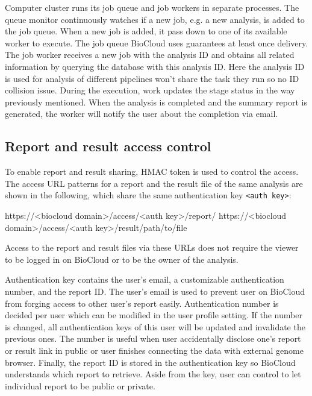 Computer cluster runs its job queue and job workers in separate processes. The
queue monitor continuously watches if a new job, e.g. a new analysis, is added
to the job queue. When a new job is added, it pass down to one of its available
worker to execute. The job queue BioCloud uses guarantees at least once
delivery. The job worker receives a new job with the analysis ID and obtains
all related information by querying the database with this analysis ID. Here
the analysis ID is used for analysis of different pipelines won't share the
task they run so no ID collision issue. During the execution, work updates the
stage status in the way previously mentioned. When the analysis is completed
and the summary report is generated, the worker will notify the user about the
completion via email.


\subsection{Report and result access control}

To enable report and result sharing, HMAC token is used to control the access.
The access URL patterns for a report and the result file of the same analysis
are shown in the following, which share the same authentication key
\texttt{<auth key>}:

\begin{CVerbatim}[fontsize=\small]
https://<biocloud domain>/access/<auth key>/report/
https://<biocloud domain>/access/<auth key>/result/path/to/file
\end{CVerbatim}

\vspace{-1em}\noindent
Access to the report and result files via these URLs does not require the
viewer to be logged in on BioCloud or to be the owner of the analysis.

Authentication key contains the user's email, a customizable authentication
number, and the report ID. The user's email is used to prevent user on BioCloud
from forging access to other user's report easily. Authentication number is
decided per user which can be modified in the user profile setting. If the
number is changed, all authentication keys of this user will be updated and
invalidate the previous ones. The number is useful when user accidentally
disclose one's report or result link in public or user finishes connecting the
data with external genome browser. Finally, the report ID is stored in the
authentication key so BioCloud understands which report to retrieve. Aside from
the key, user can control to let individual report to be public or private.

